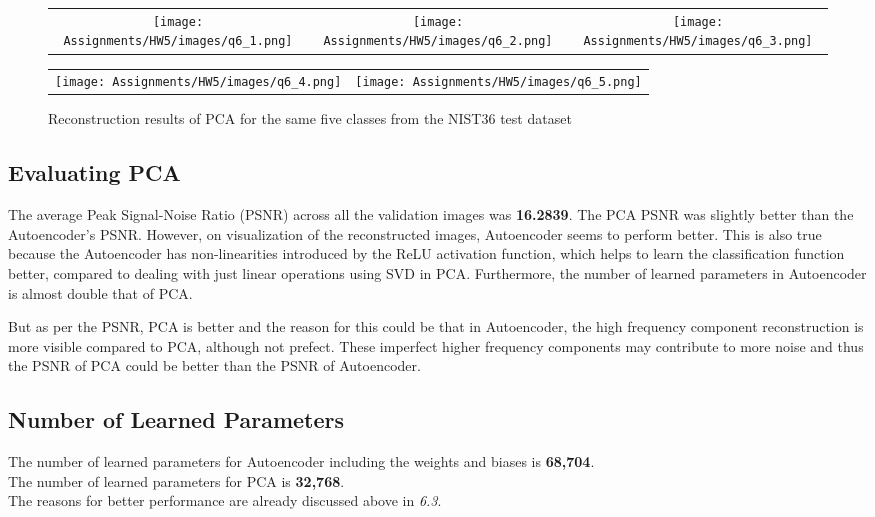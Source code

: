 \documentclass[a4paper]{article}
\begin{document}
\begin{figure}[!ht]
\centering
\begin{tabular}{ccc}
{\texttt{[image: Assignments/HW5/images/q6\_1.png]}} &
{\texttt{[image: Assignments/HW5/images/q6\_2.png]}} &
{\texttt{[image: Assignments/HW5/images/q6\_3.png]}}
\end{tabular}
\begin{tabular}{cc}
{\texttt{[image: Assignments/HW5/images/q6\_4.png]}} &
{\texttt{[image: Assignments/HW5/images/q6\_5.png]}}
\end{tabular}
\caption{Reconstruction results of PCA for the same five classes from the NIST36 test dataset}
\end{figure}

\subsection{Evaluating PCA}
The average Peak Signal-Noise Ratio (PSNR) across all the validation images was \textbf{16.2839}. The PCA PSNR was slightly better than the Autoencoder's PSNR. However, on visualization of the reconstructed images, Autoencoder seems to perform better. This is also true because the Autoencoder has non-linearities introduced by the ReLU activation function, which helps to learn the classification function better, compared to dealing with just linear operations using SVD in PCA. Furthermore, the number of learned parameters in Autoencoder is almost double that of PCA. 

But as per the PSNR, PCA is better and the reason for this could be that in Autoencoder, the high frequency component reconstruction is more visible compared to PCA, although not prefect. These imperfect higher frequency components may contribute to more noise and thus the PSNR of PCA could be better than the PSNR of Autoencoder.

\subsection{Number of Learned Parameters}
The number of learned parameters for Autoencoder including the weights and biases is \textbf{68,704}.\\
The number of learned parameters for PCA is \textbf{32,768}. \\
The reasons for better performance are already discussed above in \textit{6.3}.
\end{document}
